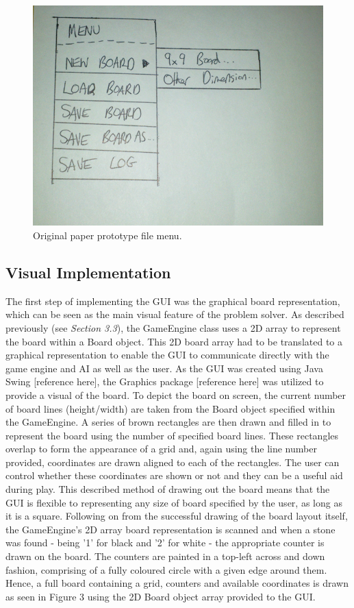 \documentclass{l3proj}
\begin{document}
\begin{figure}[H]
\centering
\includegraphics[scale=0.4]{Images/GUI-2-PP.png}
\caption{Original paper prototype file menu.}
\end{figure}

\subsection{Visual Implementation}

The first step of implementing the GUI was the graphical board representation, which can be seen as the main visual feature of the problem solver. As described previously (see \textit{Section 3.3}), the GameEngine class uses a 2D array to represent the board within a Board object. This 2D board array had to be translated to a graphical representation to enable the GUI to communicate directly with the game engine and AI as well as the user. As the GUI was created using Java Swing [reference here], the Graphics package [reference here] was utilized to provide a visual of the board. To depict the board on screen, the current number of board lines (height/width) are taken from the Board object specified within the GameEngine. A series of brown rectangles are then drawn and filled in to represent the board using the number of specified board lines. These rectangles overlap to form the appearance of a grid and, again using the line number provided, coordinates are drawn aligned to each of the rectangles. The user can control whether these coordinates are shown or not and they can be a useful aid during play. This described method of drawing out the board means that the GUI is flexible to representing any size of board specified by the user, as long as it is a square. Following on from the successful drawing of the board layout itself, the GameEngine's 2D array board representation is scanned and when a stone was found - being '1' for black and '2' for white - the appropriate counter is drawn on the board. The counters are painted in a top-left across and down fashion, comprising of a fully coloured circle with a given edge around them. Hence, a full board containing a grid, counters and available coordinates is drawn as seen in Figure 3 using the 2D Board object array provided to the GUI.
\end{document}
